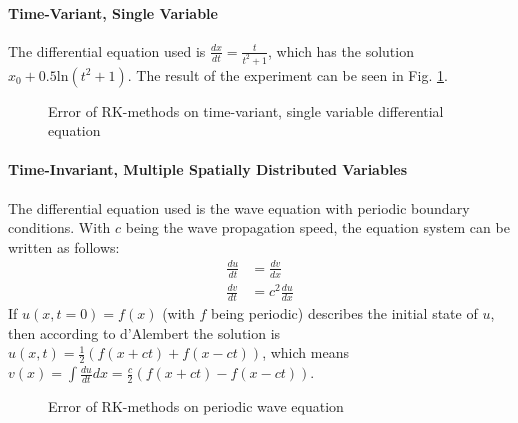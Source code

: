 \paragraph*{Time-Variant, Single Variable}
The differential equation used is $\frac{dx}{dt}=\frac{t}{t^2+1}$, which has the solution $x_0 + 0.5\text{ln}(t^2+1)$.
The result of the experiment can be seen in Fig. \ref{fig:RK_error_y'=tdiv(t_t+1)}.
\begin{figure}[!h]
    \caption{Error of RK-methods on time-variant, single variable differential equation}
    \label{fig:RK_error_y'=tdiv(t_t+1)}
\end{figure}

\paragraph*{Time-Invariant, Multiple Spatially Distributed Variables}
The differential equation used is the wave equation with periodic boundary conditions.
With $c$ being the wave propagation speed, the equation system can be written as follows:
\begin{align*}
\frac{du}{dt}&=\frac{dv}{dx}\\
\frac{dv}{dt}&=c^2\frac{du}{dx}
\end{align*}
If $u(x,t=0)=f(x)$ (with $f$ being periodic) describes the initial state of $u$, then according to d'Alembert the solution is $u(x,t)=\frac{1}{2}(f(x+ct)+f(x-ct))$, which means $v(x)=\int \frac{du}{dt} dx = \frac{c}{2}(f(x+ct)-f(x-ct))$.

\begin{figure}[!h]
    \caption{Error of RK-methods on periodic wave equation}
    \label{fig:wave_order_line}
\end{figure}

